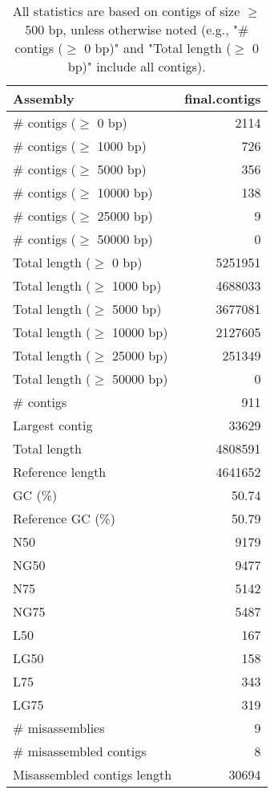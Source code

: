 \documentclass[12pt,a4paper]{article}
\begin{document}
\begin{table}[ht]
\begin{center}
\caption{All statistics are based on contigs of size $\geq$ 500 bp, unless otherwise noted (e.g., "\# contigs ($\geq$ 0 bp)" and "Total length ($\geq$ 0 bp)" include all contigs).}
\begin{tabular}{|l*{1}{|r}|}
\hline
Assembly & final.contigs \\ \hline
\# contigs ($\geq$ 0 bp) & 2114 \\ \hline
\# contigs ($\geq$ 1000 bp) & 726 \\ \hline
\# contigs ($\geq$ 5000 bp) & 356 \\ \hline
\# contigs ($\geq$ 10000 bp) & 138 \\ \hline
\# contigs ($\geq$ 25000 bp) & 9 \\ \hline
\# contigs ($\geq$ 50000 bp) & 0 \\ \hline
Total length ($\geq$ 0 bp) & 5251951 \\ \hline
Total length ($\geq$ 1000 bp) & 4688033 \\ \hline
Total length ($\geq$ 5000 bp) & 3677081 \\ \hline
Total length ($\geq$ 10000 bp) & 2127605 \\ \hline
Total length ($\geq$ 25000 bp) & 251349 \\ \hline
Total length ($\geq$ 50000 bp) & 0 \\ \hline
\# contigs & 911 \\ \hline
Largest contig & 33629 \\ \hline
Total length & 4808591 \\ \hline
Reference length & 4641652 \\ \hline
GC (\%) & 50.74 \\ \hline
Reference GC (\%) & 50.79 \\ \hline
N50 & 9179 \\ \hline
NG50 & 9477 \\ \hline
N75 & 5142 \\ \hline
NG75 & 5487 \\ \hline
L50 & 167 \\ \hline
LG50 & 158 \\ \hline
L75 & 343 \\ \hline
LG75 & 319 \\ \hline
\# misassemblies & 9 \\ \hline
\# misassembled contigs & 8 \\ \hline
Misassembled contigs length & 30694 \\ \hline

\end{tabular}
\end{center}
\end{table}
\end{document}
